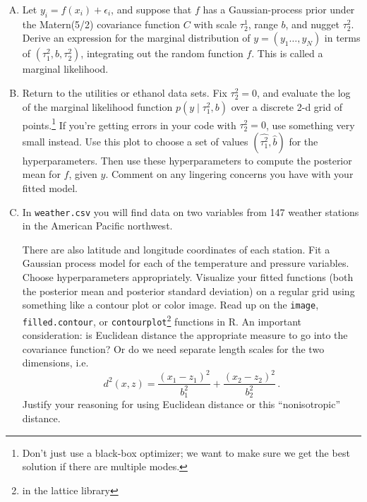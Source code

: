 \documentclass[11pt]{article}
\begin{document}
\begin{enumerate}[(A)]
\item Let $y_i = f(x_i) + \epsilon_i$, and suppose that $f$ has a Gaussian-process prior under the Matern(5/2) covariance function $C$ with scale $\tau^1_2$, range $b$, and nugget $\tau^2_2$.  Derive an expression for the marginal distribution of $y = (y_1 \ldots, y_N)$ in terms of $(\tau^2_1, b, \tau^2_2)$, integrating out the random function $f$.  This is called a marginal likelihood.

\item Return to the utilities or ethanol data sets. Fix $\tau^2_2 = 0$, and evaluate the log of the marginal likelihood function $p(y \mid \tau^2_1, b)$ over a discrete 2-d grid of points.\footnote{Don't just use a black-box optimizer; we want to make sure we get the best solution if there are multiple modes.} If you're getting errors in your code with $\tau^2_2 = 0$, use something very small instead.  Use this plot to choose a set of values $(\hat{\tau^2_1}, \hat{b})$ for the hyperparameters.  Then use these hyperparameters to compute the posterior mean for $f$, given $y$.  Comment on any lingering concerns you have with your fitted model.

\item In \verb|weather.csv| you will find data on two variables from 147 weather stations in the American Pacific northwest.
There are also latitude and longitude coordinates of each  station.  Fit a Gaussian process model for each of the temperature and pressure variables.  Choose hyperparameters appropriately.  Visualize your fitted functions (both the posterior mean and posterior standard deviation) on a regular grid using something like a contour plot or color image.  Read up on the \verb|image|, \verb|filled.contour|, or \verb|contourplot|\footnote{in the lattice library} functions in R.  An important consideration: is Euclidean distance the appropriate measure to go into the covariance function?  Or do we need separate length scales for the two dimensions, i.e.
$$
d^2(x, z) = \frac{(x_1 - z_1)^2}{b_1^2} +  \frac{(x_2 - z_2)^2}{b_2^2} \, .
$$
Justify your reasoning for using Euclidean distance or this ``nonisotropic'' distance.



\end{enumerate}
\end{document}
